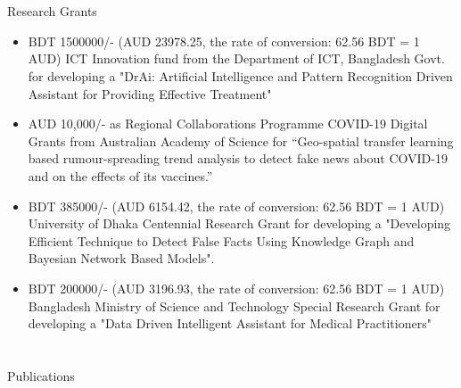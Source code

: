 \documentclass{my_cv}
\begin{document}
\section{\faMoney}{Research Grants}

\begin{itemize}[noitemsep]
    \item BDT 1500000/- (AUD 23978.25, the rate of conversion: 62.56 BDT = 1 AUD) 
ICT Innovation fund from the Department of ICT, Bangladesh Govt. for developing a "DrAi: Artificial Intelligence and Pattern Recognition Driven Assistant for Providing Effective Treatment"
    \item AUD 10,000/- as Regional Collaborations Programme COVID-19 Digital Grants from Australian Academy of Science for “Geo-spatial transfer learning based rumour-spreading trend analysis to detect fake news about COVID-19 and on the effects of its vaccines.”
    \item BDT 385000/- (AUD 6154.42, the rate of conversion: 62.56 BDT = 1 AUD) 
University of Dhaka Centennial Research Grant for developing a "Developing Efficient Technique to Detect False Facts Using Knowledge Graph and Bayesian Network Based Models". 
    \item BDT 200000/- (AUD 3196.93, the rate of conversion: 62.56 BDT = 1 AUD)
Bangladesh Ministry of Science and Technology Special Research Grant for developing a "Data Driven Intelligent Assistant for Medical Practitioners"

\end{itemize}

\section{\faPrint}{Publications}
\end{document}
